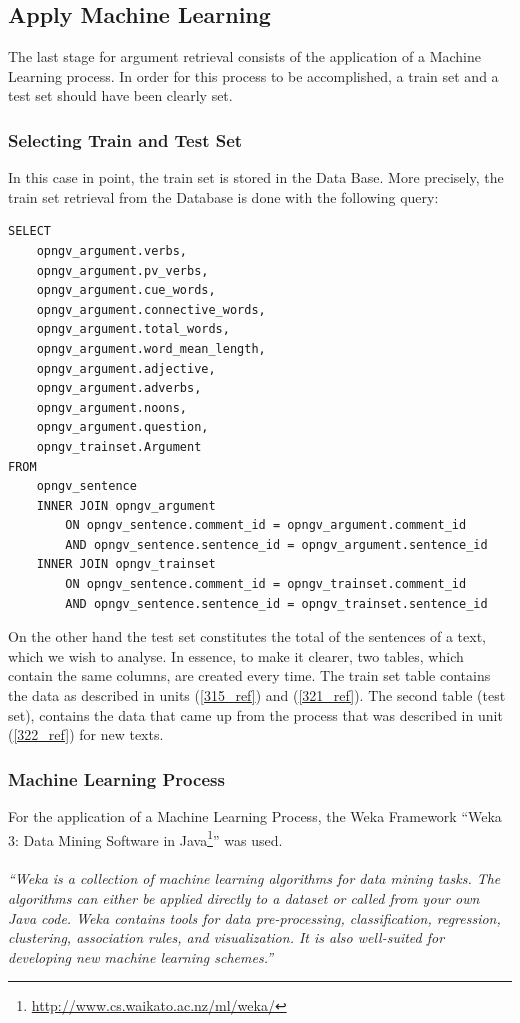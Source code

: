 \subsection{Apply Machine Learning}\label{323_ref}
The last stage for argument retrieval consists of the application of a Machine Learning process. In order for this process to be accomplished, a train set and a test set should have been clearly set.

\subsubsection{Selecting Train and Test Set}\label{3231_ref}
In this case in point, the train set is stored in the Data Base. More precisely, the train set retrieval from the Database is done with the following query:
\newpage
\lstset{language=SQL}
\begin{lstlisting}[frame=single, basicstyle=\small]
SELECT
	opngv_argument.verbs,
	opngv_argument.pv_verbs,
	opngv_argument.cue_words,
	opngv_argument.connective_words,
	opngv_argument.total_words,
	opngv_argument.word_mean_length,
	opngv_argument.adjective,
	opngv_argument.adverbs,
	opngv_argument.noons,
	opngv_argument.question,
	opngv_trainset.Argument
FROM
	opngv_sentence
	INNER JOIN opngv_argument
		ON opngv_sentence.comment_id = opngv_argument.comment_id
	 	AND opngv_sentence.sentence_id = opngv_argument.sentence_id
	INNER JOIN opngv_trainset
	 	ON opngv_sentence.comment_id = opngv_trainset.comment_id
	 	AND opngv_sentence.sentence_id = opngv_trainset.sentence_id
\end{lstlisting}
On the other hand the test set constitutes the total of the sentences of a text, which we wish to analyse. In essence, to make it clearer, two tables, which contain the same columns, are created every time. The train set table contains the data as described in units (\ref{315_ref}) and (\ref{321_ref}). The second table (test set), contains the data that came up from the process that was described in unit (\ref{322_ref}) for new texts.

\subsubsection{Machine Learning Process}\label{3232_ref}
For the application of a Machine Learning Process, the Weka Framework ``Weka 3: Data Mining Software in Java\footnote{\url{http://www.cs.waikato.ac.nz/ml/weka/}}'' was used.\\
\\
\textit{“Weka is a collection of machine learning algorithms for data mining tasks. The algorithms can either be applied directly to a dataset or called from your own Java code. Weka contains tools for data pre-processing, classification, regression, clustering, association rules, and visualization. It is also well-suited for developing new machine learning schemes.”}

